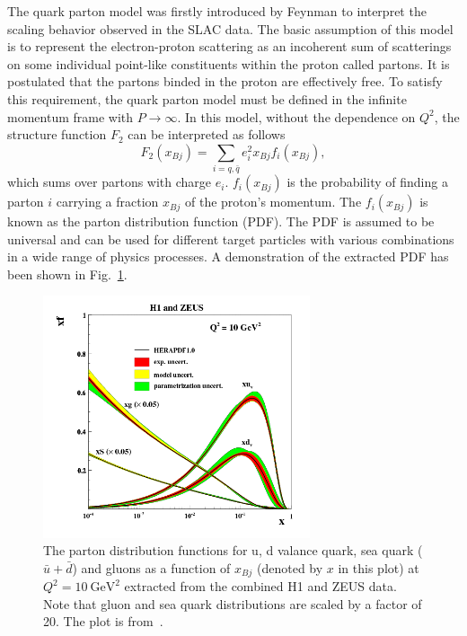 The quark parton model was firstly introduced by Feynman to interpret the
scaling behavior observed in the SLAC data. The basic assumption of this model
is to represent the electron-proton scattering as an incoherent sum of
scatterings on some individual point-like constituents within the proton called
partons. It is postulated that the partons binded in the proton are effectively
free. To satisfy this requirement, the quark parton model must be defined in the
infinite momentum frame with $P\rightarrow\infty$. In this model, without the
dependence on $Q^{2}$, the structure function $F_{2}$ can be interpreted as
follows
\begin{equation}
F_{2}(x_{Bj})=\sum_{i=q,\bar{q}}e^{2}_{i}x_{Bj}f_{i}(x_{Bj}),
\label{eqn:F2_QPM}
\end{equation}
which sums over partons with charge $e_{i}$. $f_{i}(x_{Bj})$ is the probability
of finding a parton $i$ carrying a fraction $x_{Bj}$ of the proton's momentum.
The $f_{i}(x_{Bj})$ is known as the parton distribution function (PDF). The PDF
is assumed to be universal and can be used for different target particles with
various combinations in a wide range of physics processes. 
A demonstration of the extracted PDF has been shown in Fig.~\ref{fig:PDF}.
\begin{figure}
\centering
\includegraphics[width=0.7\textwidth]{plots/chpt2/PDF_H1andZEUS.png}
\caption[The parton distributions in a proton extracted from the combined H1 and ZEUS data by the HERAPDF program] {
The parton distribution functions for u, d valance quark, sea quark ($\bar{u}+\bar{d}$) and gluons as a function of $x_{Bj}$ (denoted by $x$ in this plot) at $Q^{2}=10 \ \mathrm{GeV}^{2}$ extracted from the combined H1 and ZEUS data. Note that gluon and sea quark distributions are scaled by a factor of 20. The plot is from~\cite{Aaron:2009aa}.}
\label{fig:PDF}
\end{figure}

